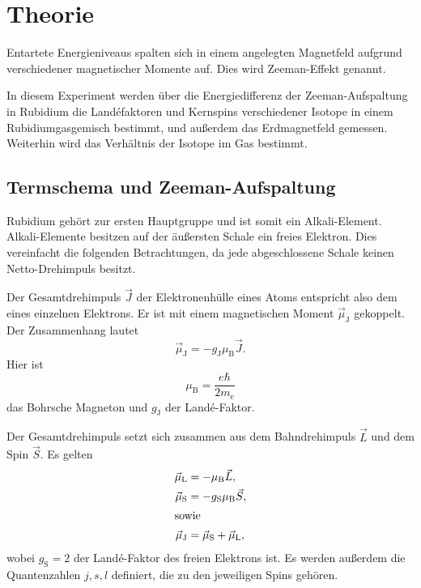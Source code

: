 \section{Theorie}%
\label{sec:theorie}

Entartete Energieniveaus spalten sich in einem angelegten Magnetfeld
aufgrund verschiedener magnetischer Momente
auf.
Dies wird Zeeman-Effekt genannt.

In diesem Experiment werden über die Energiedifferenz der
Zeeman-Aufspaltung in Rubidium
die Land\'efaktoren und Kernspins verschiedener Isotope
in einem Rubidiumgasgemisch bestimmt,
und außerdem das Erdmagnetfeld gemessen.
Weiterhin wird das Verhältnis der Isotope im Gas bestimmt.


\subsection{Termschema und Zeeman-Aufspaltung}%
\label{sub:termschema_und_zeeman_aufspaltung}

Rubidium gehört zur ersten Hauptgruppe und ist somit ein Alkali-Element.
Alkali-Elemente besitzen auf der äußersten Schale ein freies Elektron.
Dies vereinfacht die folgenden Betrachtungen, da jede abgeschlossene Schale
keinen Netto-Drehimpuls besitzt.

Der Gesamtdrehimpuls $\vec{J}$ der Elektronenhülle eines Atoms entspricht also
dem eines einzelnen Elektrons.
Er ist mit einem magnetischen Moment $\vec{\mu}_{\text{J}}$ gekoppelt.
Der Zusammenhang lautet
\begin{equation}
  \vec{\mu}_{\text{J}} = -g_{\text{J}} \mu_{\text{B}} \vec{J}.
\end{equation}
Hier ist
\begin{equation}
  \mu_{\text{B}} = \frac{e \hbar}{2 m_\text{e}}
\end{equation}
das Bohrsche Magneton und $g_{\text{J}}$ der Land\'e-Faktor.

Der Gesamtdrehimpuls setzt sich zusammen aus dem Bahndrehimpuls $\vec{L}$ und
dem Spin $\vec{S}$.
Es gelten
\begin{align}
  \vec{\mu}_{\text{L}} &= -\mu_{\text{B}} \vec{L}, \\
  \vec{\mu}_{\text{S}} &= -g_{\text{S}} \mu_{\text{B}} \vec{S}, \\
  \intertext{sowie}
  \vec{\mu}_{\text{J}} &= \vec{\mu}_{\text{S}} + \vec{\mu}_{\text{L}},
\end{align}
wobei $g_{\text{S}} = \num{2}$ der Land\'e-Faktor des freien Elektrons ist.
Es werden außerdem die Quantenzahlen $j, s, l$ definiert, die zu den jeweiligen Spins
gehören.

